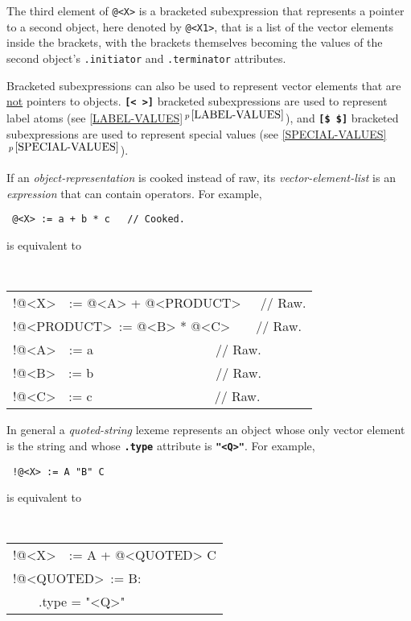 \documentclass[12pt]{article}
\makeatletter
\newcommand{\TT}[1]{{\tt \bfseries #1}}
\newcommand{\ttdkey}[1]{\TT{.#1}\index{#1@{\tt .#1}}}
\newcommand{\itemref}[1]{\ref{#1}$\,^{p\,\pageref{#1}}$}
\newenvironment{indpar}[1][0.3in]%
	{\begin{list}{}%
		     {\setlength{\itemsep}{0in}%
		      \setlength{\topsep}{0in}%
		      \setlength{\parsep}{1ex}%
		      \setlength{\labelwidth}{#1}%
		      \setlength{\leftmargin}{#1}%
		      \addtolength{\leftmargin}{\labelsep}}%
	 \item}%
	{\end{list}}
\makeatother
\begin{document}
The third element of {\tt @<X>} is a bracketed subexpression that
represents a pointer to a second object, here denoted by {\tt @<X1>},
that is a list of the vector elements inside the brackets, with the brackets
themselves becoming the values of the second object's {\tt .initiator}
and {\tt .terminator} attributes.

Bracketed subexpressions can also be used to represent vector elements
that are \underline{not} pointers to objects.  \TT{[<~>]}
bracketed subexpressions are used to represent
label atoms (see \itemref{LABEL-VALUES}),
and \TT{[\$~\$]} bracketed subexpressions are used to represent
special values (see \itemref{SPECIAL-VALUES}).

If an {\em object-representation} is cooked instead of raw,
its {\em vector-element-list} is an {\em expression} that can
contain operators.  For example,
\begin{indpar}
\begin{indpar}
\tt
@<X> := a + b * c~~~// Cooked.
\end{indpar}
is equivalent to
\begin{indpar}
\tt
\begin{tabular}{l}
!@<X>~~:= @<A> + @<PRODUCT>~~~// Raw. \\
!@<PRODUCT>~:= @<B> * @<C>~~~~// Raw. \\
!@<A>~~:= a~~~~~~~~~~~~~~~~~~~// Raw. \\
!@<B>~~:= b~~~~~~~~~~~~~~~~~~~// Raw. \\
!@<C>~~:= c~~~~~~~~~~~~~~~~~~~// Raw. \\
\end{tabular}
\end{indpar}
\end{indpar}

In general a {\em quoted-string} lexeme\label{QUOTE-BRACKETS}
represents an object
whose only vector element is the string and whose \ttdkey{type}
attribute is \TT{"<Q>"}.  For example,
\begin{indpar}
\begin{indpar}
\tt
!@<X> := A "B" C
\end{indpar}
is equivalent to
\begin{indpar}
\tt
\begin{tabular}{l}
!@<X>~~:= A + @<QUOTED> C \\
!@<QUOTED>~:= B: \\
~~~~.type = "<Q>" \\
\end{tabular}
\end{indpar}
\end{indpar}
\end{document}
